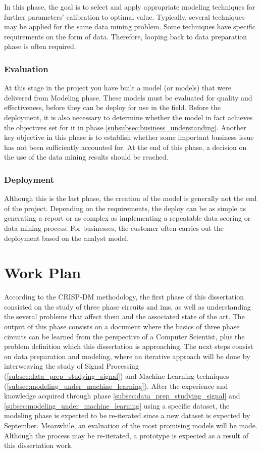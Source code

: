 In this phase, the goal is to select and apply appropriate modeling techniques for further parameters' calibration to optimal value. Typically, several techniques may be applied for the same data mining problem. Some techniques have specific requirements on the form of data. Therefore, looping back to data preparation phase is often required.

\subsubsection{Evaluation}

At this stage in the project you have built a model (or models) that were delivered from Modeling phase. These models must be evaluated for quality and effectiveness, before they can be deploy for use in the field.
Before the deployment, it is also necessary to determine whether the model in fact achieves the objectives set for it in phase \ref{subsubsec:business_understanding}. Another key objective in this phase is to establish whether some important business issue has not been sufficiently accounted for. At the end of this phase, a decision on the use of the data mining results should be reached.

\subsubsection{Deployment}

Although this is the last phase, the creation of the model is generally not the end of the project. Depending on the requirements, the deploy can be as simple as generating a report or as complex as implementing a repeatable data scoring or data mining process. For businesses, the customer often carries out the deployment based on the analyst model.


\section{Work Plan} %
\label{sec:work_plan}

According to the CRISP-DM methodology, the first phase of this dissertation consisted on the study of three phase circuits and \acrshort{ims}, as well as understanding the several problems that affect them and the associated state of the art. The output of this phase consists on a document where the basics of three phase circuits can be learned from the perspective of a Computer Scientist, plus the problem definition which this dissertation is approaching. The next steps consist on data preparation and modeling, where an iterative approach will be done by interweaving the study of Signal Processing (\ref{subsec:data_prep_studying_signal}) and Machine Learning techniques (\ref{subsec:modeling_under_machine_learning}). 
After the experience and knowledge acquired through phase \ref{subsec:data_prep_studying_signal} and \ref{subsec:modeling_under_machine_learning} using a specific dataset, the modeling phase is expected to be re-iterated since a new dataset is expected by September. Meanwhile, an evaluation of the most promising models will be made. Although the process may be re-iterated, a prototype is expected as a result of this dissertation work.


